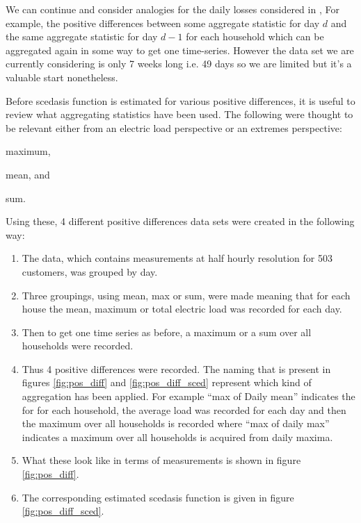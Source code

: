 \documentclass[a4paper]{article}
\begin{document}


We can continue and consider analogies for the daily losses considered in \cite{einmahl16}, For example, the positive differences between some aggregate statistic for day $d$ and the same aggregate statistic for day $d-1$ for each household which can be aggregated again in some way to get one time-series. However the data set we are currently considering is only 7 weeks long i.e. 49 days so we are limited but it's a valuable start nonetheless.

Before scedasis function is estimated for various positive differences, it is useful to review what aggregating statistics have been used. The following were thought to be relevant either from an electric load perspective or an extremes perspective: \begin{enumerate*}[label=\roman*)] \item maximum, \item mean, and \item sum. \end{enumerate*} Using these, 4 different positive differences data sets were created in the following way:
\begin{enumerate}
\item The data, which contains measurements at half hourly resolution for 503 customers, was grouped by day.
\item Three groupings, using mean, max or sum, were made meaning that for each house the mean, maximum or total electric load was recorded for each day.
\item Then to get one time series as before, a maximum or a sum over all households were recorded.
\item Thus 4 positive differences were recorded. The naming that is present in figures \ref{fig:pos_diff} and \ref{fig:pos_diff_sced} represent which kind of aggregation has been applied. For example ``max of Daily mean'' indicates the for for each household, the average load was recorded for each day and then the maximum  over all households is recorded where ``max of daily max'' indicates a maximum over all households is acquired from daily maxima.
\item What these look like in terms of measurements is shown in figure \ref{fig:pos_diff}.
\item The corresponding estimated scedasis function is given in figure \ref{fig:pos_diff_sced}.
\end{enumerate}
\end{document}
